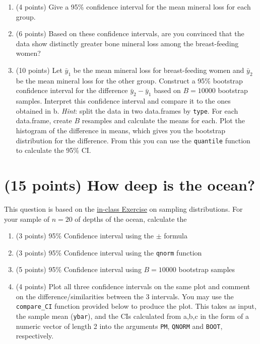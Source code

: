 \documentclass[letterpaper,12pt,twoside,]{pinp}
\providecommand{\tightlist}{%
  \setlength{\itemsep}{0pt}\setlength{\parskip}{0pt}}
\begin{document}
\begin{enumerate}
\def\labelenumi{\alph{enumi}.}
\tightlist
\item
  (4 points) Give a 95\% confidence interval for the mean mineral loss
  for each group.
\item
  (6 points) Based on these confidence intervals, are you convinced that
  the data show distinctly greater bone mineral loss among the
  breast-feeding women?
\item
  (10 points) Let \(\bar{y}_1\) be the mean mineral loss for
  breast-feeding women and \(\bar{y}_2\) be the mean mineral loss for
  the other group. Construct a 95\% bootstrap confidence interval for
  the difference \(\bar{y}_2 - \bar{y}_1\) based on \(B=10000\)
  bootstrap samples. Interpret this confidence interval and compare it
  to the ones obtained in b. \emph{Hint}: split the data in two
  data.frames by \texttt{type}. For each data.frame, create \(B\)
  resamples and calculate the means for each. Plot the histogram of the
  difference in means, which gives you the bootstrap distribution for
  the difference. From this you can use the \texttt{quantile} function
  to calculate the 95\% CI.
\end{enumerate}

\hypertarget{points-how-deep-is-the-ocean}{%
\section{(15 points) How deep is the
ocean?}\label{points-how-deep-is-the-ocean}}

This question is based on the
\href{https://github.com/sahirbhatnagar/EPIB607/blob/master/labs/003-ocean-depths/water_exercise_epib607.pdf}{in-class
Exercise} on sampling distributions. For your sample of \(n=20\) of
depths of the ocean, calculate the

\begin{enumerate}
\def\labelenumi{\alph{enumi}.}
\tightlist
\item
  (3 points) 95\% Confidence interval using the \(\pm\) formula
\item
  (3 points) 95\% Confidence interval using the \texttt{qnorm} function
\item
  (5 points) 95\% Confidence interval using \(B=10000\) bootstrap
  samples
\item
  (4 points) Plot all three confidence intervals on the same plot and
  comment on the difference/similarities between the 3 intervals. You
  may use the \texttt{compare\_CI} function provided below to produce
  the plot. This takes as input, the sample mean (\texttt{ybar}), and
  the CIs calculated from a,b,c in the form of a numeric vector of
  length 2 into the arguments \texttt{PM}, \texttt{QNORM} and
  \texttt{BOOT}, respectively.
\end{enumerate}
\end{document}
